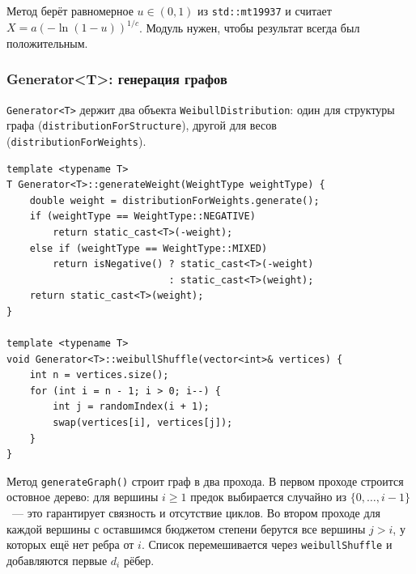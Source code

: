 Метод берёт равномерное $u \in (0,1)$ из \texttt{std::mt19937}
и считает $X = a(-\ln(1 - u))^{1/c}$. Модуль нужен, чтобы результат
всегда был положительным.

\subsubsection{Generator\textless T\textgreater: генерация графов}

\texttt{Generator<T>} держит два объекта \texttt{WeibullDistribution}:
один для структуры графа (\texttt{distributionForStructure}), другой
для весов (\texttt{distributionForWeights}).

\begin{lstlisting}[style=cstyle, caption={Генератор весов и Вейбуллово перемешивание (generator.cpp)}]
template <typename T>
T Generator<T>::generateWeight(WeightType weightType) {
    double weight = distributionForWeights.generate();
    if (weightType == WeightType::NEGATIVE)
        return static_cast<T>(-weight);
    else if (weightType == WeightType::MIXED)
        return isNegative() ? static_cast<T>(-weight)
                            : static_cast<T>(weight);
    return static_cast<T>(weight);
}

template <typename T>
void Generator<T>::weibullShuffle(vector<int>& vertices) {
    int n = vertices.size();
    for (int i = n - 1; i > 0; i--) {
        int j = randomIndex(i + 1);
        swap(vertices[i], vertices[j]);
    }
}
\end{lstlisting}

Метод \texttt{generateGraph()} строит граф в два прохода.
В первом проходе строится остовное дерево: для вершины $i \geq 1$
предок выбирается случайно из $\{0, \ldots, i-1\}$~--- это гарантирует
связность и отсутствие циклов.
Во втором проходе для каждой вершины с оставшимся бюджетом степени
берутся все вершины $j > i$, у которых ещё нет ребра от $i$. Список
перемешивается через \texttt{weibullShuffle} и добавляются первые $d_i$ рёбер.
